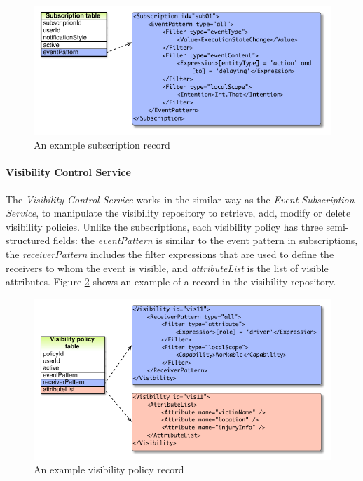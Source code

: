 \begin{figure}[htbp] %
	\centering
	\includegraphics{sub_repository.pdf} 
	\caption{An example subscription record}
	\label{fig:sub_repository}
\end{figure}

\paragraph*{Visibility Control Service} %
\label{par:visibility_control_service}
The \emph{Visibility Control Service} works in the similar way as the \emph{Event Subscription Service}, to manipulate the visibility repository to retrieve, add, modify or delete visibility policies. Unlike the subscriptions, each visibility policy has three semi-structured fields: the \emph{eventPattern} is similar to the event pattern in subscriptions, the \emph{receiverPattern} includes the filter expressions that are used to define the receivers to whom the event is visible, and \emph{attributeList} is the list of visible attributes. Figure \ref{fig:vis_repository} shows an example of a record in the visibility repository.
\begin{figure}[htbp] %
	\centering
	\includegraphics{vis_repository.pdf} 
	\caption{An example visibility policy record}
	\label{fig:vis_repository}
\end{figure}

